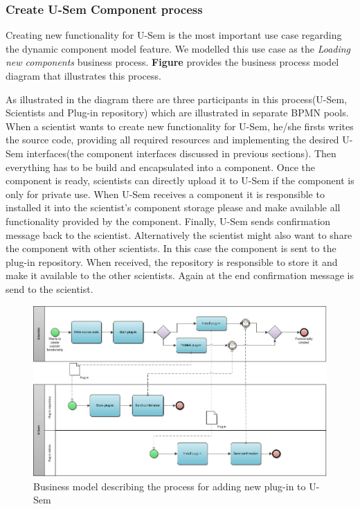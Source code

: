 \subsubsection{Create U-Sem Component process}

Creating new functionality for U-Sem is the most important use case regarding the dynamic component model feature. We modelled this use case as the \textit{Loading new components} business process. \textbf{Figure} provides the business process model diagram that illustrates this process. 

As illustrated in the diagram there are three participants in this process(U-Sem, Scientists and Plug-in repository) which are illustrated in separate BPMN pools. When a scientist wants to create new functionality for U-Sem, he/she firsts writes the source code, providing all required resources and implementing the desired U-Sem interfaces(the component interfaces discussed in previous sections). Then everything has to be build and encapsulated into a component. Once the component is ready, scientists can directly upload it to U-Sem if the component is only for private use. When U-Sem receives a component it is responsible to installed it into the scientist's component storage please and make available all functionality provided by the component. Finally, U-Sem sends confirmation message back to the scientist. Alternatively the scientist might also want to share the component with other scientists. In this case the component is sent to the plug-in repository. When received, the repository is responsible to store it and make it available to the other scientists. Again at the end confirmation message is send to the scientist.

\begin{figure}[h!]
  \centering
  	\includegraphics[scale=0.7,angle=90]{plug-in/business_processes/CreatePlugInBusinessModel.jpg}
  \caption{Business model describing the process for adding new plug-in to U-Sem}
\end{figure}

